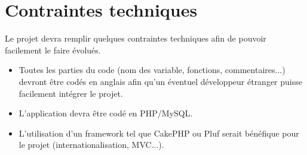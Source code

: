 \documentclass[10pt,a4paper]{article}
\begin{document}
\section{Contraintes techniques}

Le projet devra remplir quelques contraintes techniques afin de pouvoir facilement le faire évolués.

\begin{itemize}
\item Toutes les parties du code (nom des variable, fonctions, commentaires...) devront être codés en anglais afin qu'un éventuel développeur étranger puisse facilement intégrer le projet.
\item L'application devra être codé en PHP/MySQL.
\item L'utilisation d'un framework tel que CakePHP ou Pluf serait bénéfique pour le projet (internationalisation, MVC...).
\end{itemize}
\end{document}
